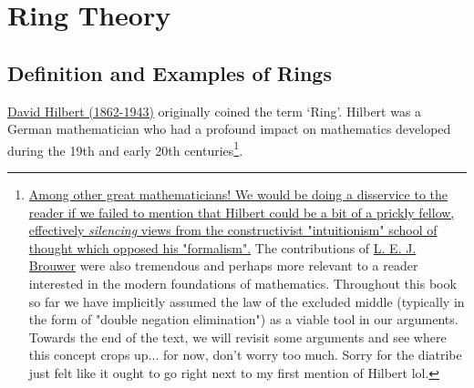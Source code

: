 

\chapter{Ring Theory}

\section{Definition and Examples of Rings}
\href{https://en.wikipedia.org/wiki/David_Hilbert}{David Hilbert (1862-1943)} originally coined the
term `Ring'. Hilbert was a German mathematician who had a profound impact on mathematics developed
during the 19th and early 20th
centuries\footnote{\href{https://en.wikipedia.org/wiki/Brouwer\%E2\%80\%93Hilbert_controversy}{Among
other great mathematicians! We would be doing a disservice to the reader if we failed to mention
that Hilbert could be a bit of a prickly fellow, effectively \textit{silencing} views from the
constructivist "intuitionism" school of thought which opposed his "formalism".} The contributions of
\href{https://en.wikipedia.org/wiki/L._E._J._Brouwer}{L. E. J. Brouwer} were also tremendous and
perhaps more relevant to a reader interested in the modern foundations of mathematics. Throughout
this book so far we have implicitly assumed the law of the excluded middle (typically in the form of
"double negation elimination") as a viable tool in our arguments. Towards the end of the text, we
will revisit some arguments and see where this concept crops up... for now, don't worry too much.
Sorry for the diatribe just felt like it ought to go right next to my first mention of Hilbert
lol.}.

